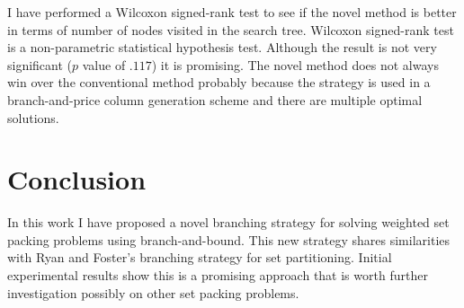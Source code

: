 \documentclass{article}
\begin{document}
I have performed a Wilcoxon signed-rank test to see if the novel method is better in terms of number of nodes visited in the search tree. Wilcoxon signed-rank test is a non-parametric statistical hypothesis test. Although the result is not very significant ($p$ value of $.117$) it is promising. The novel method does not always win over the conventional method probably because the strategy is used in a branch-and-price column generation scheme and there are multiple optimal solutions.

\section{Conclusion}

In this work I have proposed a novel branching strategy for solving weighted set packing problems using branch-and-bound. This new strategy shares similarities with Ryan and Foster's branching strategy for set partitioning. Initial experimental results show this is a promising approach that is worth further investigation possibly on other set packing problems.

  

\end{document}
